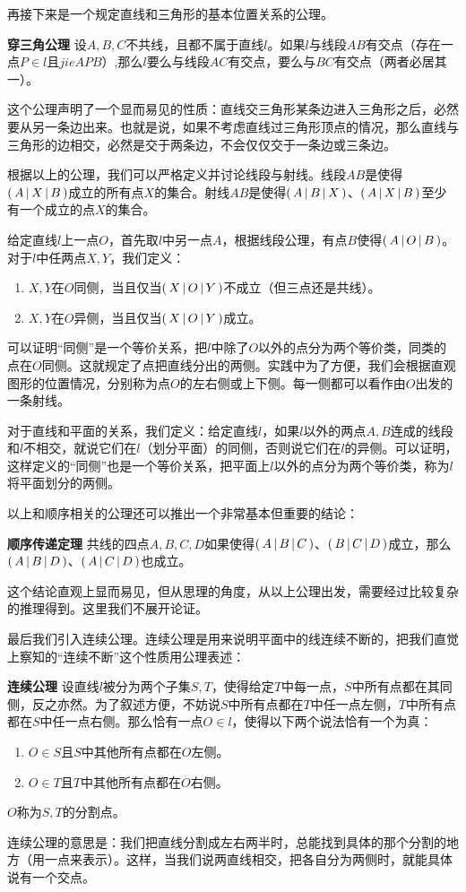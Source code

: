 \documentclass[12pt,UTF8,fontset=none]{ctexbook}
\begin{document}
\begin{appendix}
再接下来是一个规定直线和三角形的基本位置关系的公理。
\begin{po}{\textbf{穿三角公理}}\label{po:1-4}
    设$A,B,C$不共线，且都不属于直线$l$。如果$l$与线段$AB$有交点（存在一点$P\in l$且$jie{A}{P}{B}$）,那么$l$要么与线段$AC$有交点，要么与$BC$有交点（两者必居其一）。
\end{po}
这个公理声明了一个显而易见的性质：直线交三角形某条边进入三角形之后，必然要从另一条边出来。也就是说，如果不考虑直线过三角形顶点的情况，那么直线与三角形的边相交，必然是交于两条边，不会仅仅交于一条边或三条边。

根据以上的公理，我们可以严格定义并讨论线段与射线。线段$AB$是使得$\displaystyle\left( \,A \,\middle\vert \,X\,\middle\vert \,B \,\right)$成立的所有点$X$的集合。射线$AB$是使得$\displaystyle\left( \,A \,\middle\vert \,B\,\middle\vert \,X \,\right)$、$\displaystyle\left( \,A \,\middle\vert \,X\,\middle\vert \,B \,\right)$至少有一个成立的点$X$的集合。

给定直线$l$上一点$O$，首先取$l$中另一点$A$，根据线段公理，有点$B$使得$\displaystyle\left( \,A \,\middle\vert \,O\,\middle\vert \,B \,\right)$。对于$l$中任两点$X,Y$，我们定义：
\begin{enumerate}
    \item $X,Y$在$O$同侧，当且仅当$\displaystyle\left( \,X \,\middle\vert \,O\,\middle\vert \,Y \,\right)$不成立（但三点还是共线）。
    \item $X,Y$在$O$异侧，当且仅当$\displaystyle\left( \,X \,\middle\vert \,O\,\middle\vert \,Y \,\right)$成立。
\end{enumerate}
可以证明“同侧”是一个等价关系，把$l$中除了$O$以外的点分为两个等价类，同类的点在$O$同侧。这就规定了点把直线分出的两侧。实践中为了方便，我们会根据直观图形的位置情况，分别称为点$O$的左右侧或上下侧。每一侧都可以看作由$O$出发的一条射线。

对于直线和平面的关系，我们定义：给定直线$l$，如果$l$以外的两点$A,B$连成的线段和$l$不相交，就说它们在$l$（划分平面）的同侧，否则说它们在$l$的异侧。可以证明，这样定义的“同侧”也是一个等价关系，把平面上$l$以外的点分为两个等价类，称为$l$将平面划分的两侧。

以上和顺序相关的公理还可以推出一个非常基本但重要的结论：
\begin{tm}{\textbf{顺序传递定理}}\label{tm:a-0}
    共线的四点$A,B,C,D$如果使得$\displaystyle\left( \,A \,\middle\vert \,B\,\middle\vert \,C \,\right)$、$\displaystyle\left( \,B \,\middle\vert \,C\,\middle\vert \,D \,\right)$成立，那么$\displaystyle\left( \,A \,\middle\vert \,B\,\middle\vert \,D \,\right)$、$\displaystyle\left( \,A \,\middle\vert \,C\,\middle\vert \,D \,\right)$也成立。
\end{tm}
这个结论直观上显而易见，但从思理的角度，从以上公理出发，需要经过比较复杂的推理得到。这里我们不展开论证。

最后我们引入连续公理。连续公理是用来说明平面中的线连续不断的，把我们直觉上察知的“连续不断”这个性质用公理表述：
\begin{po}{\textbf{连续公理}}\label{po:1-5}
    设直线$l$被分为两个子集$S,T$，使得给定$T$中每一点，$S$中所有点都在其同侧，反之亦然。为了叙述方便，不妨说$S$中所有点都在$T$中任一点左侧，$T$中所有点都在$S$中任一点右侧。那么恰有一点$O\in l$，使得以下两个说法恰有一个为真：
    \begin{enumerate}
        \item $O\in S$且$S$中其他所有点都在$O$左侧。
        \item $O\in T$且$T$中其他所有点都在$O$右侧。
    \end{enumerate}
    $O$称为$S,T$的分割点。
\end{po}
连续公理的意思是：我们把直线分割成左右两半时，总能找到具体的那个分割的地方（用一点来表示）。这样，当我们说两直线相交，把各自分为两侧时，就能具体说有一个交点。


\end{appendix}
\end{document}
